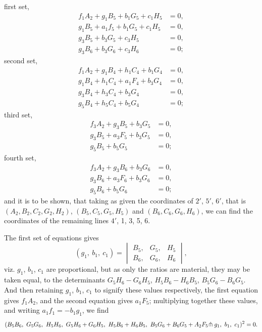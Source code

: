 \documentclass[11pt,a4paper]{article}
\begin{document}
first set,
\begin{align*}
f_{1}A_{2} + g_{1}B_{5} + b_{1}G_{5} + c_{1}H_{5} &= 0,\\
g_{1}B_{5} + a_{1}f_{5} + b_{1}G_{5} + c_{1}H_{5} &= 0,\\
g_{3}B_{5} + b_{3}G_{5} + c_{3}H_{5} &= 0,\\
g_{3}B_{6} + b_{3}G_{6} + c_{3}H_{6} &= 0;
\end{align*}
second set,
\begin{align*}
f_{1}A_{2} + g_{1}B_{4} + h_{1}C_{4} + b_{1}G_{4} &= 0,\\
g_{1}B_{4} + h_{1}C_{4} + a_{1}F_{4} + b_{3}G_{4} &= 0,\\
g_{3}B_{4} + h_{3}C_{4} + b_{3}G_{4} &= 0,\\
g_{5}B_{4} + h_{5}C_{4} + b_{5}G_{4} &= 0;
\end{align*}
third set,
\begin{align*}
f_{3}A_{2} + g_{3}B_{5} + b_{3}G_{5} &= 0,\\
g_{3}B_{5} + a_{3}F_{5} + b_{3}G_{5} &= 0,\\
g_{5}B_{5} + b_{5}G_{5} &= 0;
\end{align*}
fourth set,
\begin{align*}
f_{3}A_{2} + g_{3}B_{6} + b_{3}G_{6} &= 0,\\
g_{3}B_{6} + a_{3}F_{6} + b_{3}G_{6} &= 0,\\
g_{5}B_{6} + b_{5}G_{6} &= 0;
\end{align*}
and it is to be shown, that taking as given the coordinates of $2'$, $5'$, $6'$, that is $(A_{2}, B_{2}, C_{2}, G_{2}, H_{2})$, $(B_{5}, C_{5}, G_{5}, H_{5})$ and $(B_{6}, C_{6}, G_{6}, H_{6})$, we can find the coordinates of the remaining lines $4'$, 1, 3, 5, 6.

The first set of equations gives
\[
(g_{1},\ b_{1},\ c_{1}) = \begin{vmatrix} B_{5}, & G_{5}, & H_{5}\\ B_{6}, & G_{6}, & H_{6}\end{vmatrix},
\]
viz. $g_{1}$, $b_{1}$, $c_{1}$ are proportional, but as only the ratios are material, they may be taken equal, to the determinants $G_{5}H_{6} - G_{6}H_{5}$, $H_{5}B_{6} - H_{6}B_{5}$, $B_{5}G_{6} - B_{6}G_{5}$. And then retaining $g_{1}$, $b_{1}$, $c_{1}$ to signify these values respectively, the first equation gives $f_{1}A_{2}$, and the second equation gives $a_{1}F_{5}$; multiplying together these values, and writing $a_{1}f_{1} = -b_{1}g_{1}$, we find
\[
(B_{5}B_{6},\ G_{5}G_{6},\ H_{5}H_{6},\ G_{5}H_{6}+G_{6}H_{5},\ H_{5}B_{6}+H_{6}B_{5},\ B_{5}G_{6}+B_{6}G_{5} + A_{2}F_{5}\hspace{-0.2em}\pitchfork g_{1},\ b_{1},\ c_{1})^{2} = 0.
\]
\end{document}
